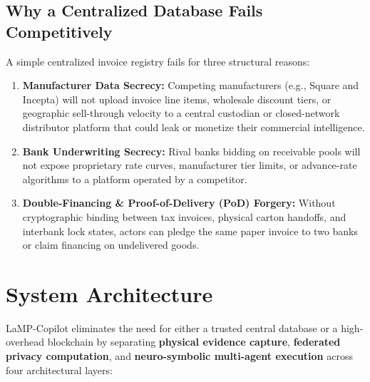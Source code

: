 \documentclass[10pt,a4paper]{article}
\begin{document}
\subsection{Why a Centralized Database Fails Competitively}
A simple centralized invoice registry fails for three structural reasons:
\begin{enumerate}[noitemsep,topsep=2pt]
    \item \textbf{Manufacturer Data Secrecy:} Competing manufacturers (e.g., Square and Incepta) will not upload invoice line items, wholesale discount tiers, or geographic sell-through velocity to a central custodian or closed-network distributor platform that could leak or monetize their commercial intelligence.
    \item \textbf{Bank Underwriting Secrecy:} Rival banks bidding on receivable pools will not expose proprietary rate curves, manufacturer tier limits, or advance-rate algorithms to a platform operated by a competitor.
    \item \textbf{Double-Financing \& Proof-of-Delivery (PoD) Forgery:} Without cryptographic binding between tax invoices, physical carton handoffs, and interbank lock states, actors can pledge the same paper invoice to two banks or claim financing on undelivered goods.
\end{enumerate}

\section{System Architecture}

LaMP-Copilot eliminates the need for either a trusted central database or a high-overhead blockchain by separating \textbf{physical evidence capture}, \textbf{federated privacy computation}, and \textbf{neuro-symbolic multi-agent execution} across four architectural layers:
\end{document}
